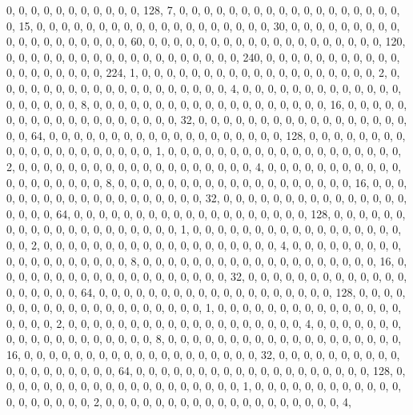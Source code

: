 \begin{DoxyCode}
       0, 0, 0, 0, 0, 0, 0, 0, 0, 0, 0, 128, 7, 0, 0, 0, 0, 0, 0, 0, 0, 0, 0, 0, 0, 0, 0, 0, 0, 0, 0, 0, 15, 0, 0,
       0, 0, 0, 0, 0, 0, 0, 0, 0, 0, 0, 0, 0, 0, 0, 0, 0, 30, 0, 0, 0, 0, 0, 0, 0, 0, 0, 0, 0, 0, 0, 0, 0, 0, 0, 0,
       0, 60, 0, 0, 0, 0, 0, 0, 0, 0, 0, 0, 0, 0, 0, 0, 0, 0, 0, 0, 0, 120, 0, 0, 0, 0, 0, 0, 0, 0, 0, 0, 0, 0, 0,
       0, 0, 0, 0, 0, 0, 240, 0, 0, 0, 0, 0, 0, 0, 0, 0, 0, 0, 0, 0, 0, 0, 0, 0, 0, 0, 224, 1, 0, 0, 0, 0, 0, 0, 0,
       0, 0, 0, 0, 0, 0, 0, 0, 0, 0, 0, 0, 2, 0, 0, 0, 0, 0, 0, 0, 0, 0, 0, 0, 0, 0, 0, 0, 0, 0, 0, 0, 4, 0, 0, 0,
       0, 0, 0, 0, 0, 0, 0, 0, 0, 0, 0, 0, 0, 0, 0, 0, 8, 0, 0, 0, 0, 0, 0, 0, 0, 0, 0, 0, 0, 0, 0, 0, 0, 0, 0, 0,
       16, 0, 0, 0, 0, 0, 0, 0, 0, 0, 0, 0, 0, 0, 0, 0, 0, 0, 0, 0, 32, 0, 0, 0, 0, 0, 0, 0, 0, 0, 0, 0, 0, 0, 0,
       0, 0, 0, 0, 0, 64, 0, 0, 0, 0, 0, 0, 0, 0, 0, 0, 0, 0, 0, 0, 0, 0, 0, 0, 0, 128, 0, 0, 0, 0, 0, 0, 0, 0, 0,
       0, 0, 0, 0, 0, 0, 0, 0, 0, 0, 0, 1, 0, 0, 0, 0, 0, 0, 0, 0, 0, 0, 0, 0, 0, 0, 0, 0, 0, 0, 0, 2, 0, 0, 0, 0,
       0, 0, 0, 0, 0, 0, 0, 0, 0, 0, 0, 0, 0, 0, 0, 4, 0, 0, 0, 0, 0, 0, 0, 0, 0, 0, 0, 0, 0, 0, 0, 0, 0, 0, 0, 8,
       0, 0, 0, 0, 0, 0, 0, 0, 0, 0, 0, 0, 0, 0, 0, 0, 0, 0, 0, 16, 0, 0, 0, 0, 0, 0, 0, 0, 0, 0, 0, 0, 0, 0, 0, 0,
       0, 0, 0, 32, 0, 0, 0, 0, 0, 0, 0, 0, 0, 0, 0, 0, 0, 0, 0, 0, 0, 0, 0, 64, 0, 0, 0, 0, 0, 0, 0, 0, 0, 0, 0,
       0, 0, 0, 0, 0, 0, 0, 0, 128, 0, 0, 0, 0, 0, 0, 0, 0, 0, 0, 0, 0, 0, 0, 0, 0, 0, 0, 0, 0, 1, 0, 0, 0, 0, 0,
       0, 0, 0, 0, 0, 0, 0, 0, 0, 0, 0, 0, 0, 0, 2, 0, 0, 0, 0, 0, 0, 0, 0, 0, 0, 0, 0, 0, 0, 0, 0, 0, 0, 0, 4, 0,
       0, 0, 0, 0, 0, 0, 0, 0, 0, 0, 0, 0, 0, 0, 0, 0, 0, 0, 8, 0, 0, 0, 0, 0, 0, 0, 0, 0, 0, 0, 0, 0, 0, 0, 0, 0,
       0, 0, 16, 0, 0, 0, 0, 0, 0, 0, 0, 0, 0, 0, 0, 0, 0, 0, 0, 0, 0, 0, 32, 0, 0, 0, 0, 0, 0, 0, 0, 0, 0, 0, 0, 0,
       0, 0, 0, 0, 0, 0, 64, 0, 0, 0, 0, 0, 0, 0, 0, 0, 0, 0, 0, 0, 0, 0, 0, 0, 0, 0, 128, 0, 0, 0, 0, 0, 0, 0, 0,
       0, 0, 0, 0, 0, 0, 0, 0, 0, 0, 0, 0, 1, 0, 0, 0, 0, 0, 0, 0, 0, 0, 0, 0, 0, 0, 0, 0, 0, 0, 0, 0, 2, 0, 0, 0,
       0, 0, 0, 0, 0, 0, 0, 0, 0, 0, 0, 0, 0, 0, 0, 0, 4, 0, 0, 0, 0, 0, 0, 0, 0, 0, 0, 0, 0, 0, 0, 0, 0, 0, 0, 0,
       8, 0, 0, 0, 0, 0, 0, 0, 0, 0, 0, 0, 0, 0, 0, 0, 0, 0, 0, 0, 16, 0, 0, 0, 0, 0, 0, 0, 0, 0, 0, 0, 0, 0, 0,
       0, 0, 0, 0, 0, 32, 0, 0, 0, 0, 0, 0, 0, 0, 0, 0, 0, 0, 0, 0, 0, 0, 0, 0, 0, 64, 0, 0, 0, 0, 0, 0, 0, 0, 0, 0,
       0, 0, 0, 0, 0, 0, 0, 0, 0, 128, 0, 0, 0, 0, 0, 0, 0, 0, 0, 0, 0, 0, 0, 0, 0, 0, 0, 0, 0, 0, 1, 0, 0, 0, 0,
       0, 0, 0, 0, 0, 0, 0, 0, 0, 0, 0, 0, 0, 0, 0, 2, 0, 0, 0, 0, 0, 0, 0, 0, 0, 0, 0, 0, 0, 0, 0, 0, 0, 0, 0, 4,

\end{DoxyCode}
